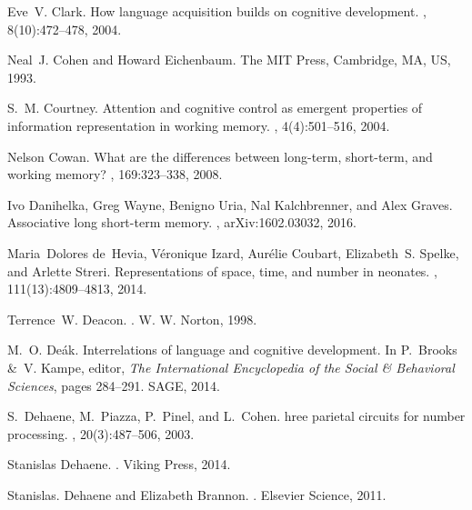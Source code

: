 \documentclass[letterpaper,11pt]{article}
\begin{document}
\begin{thebibliography}{100}
Eve~V. Clark.
\newblock How language acquisition builds on cognitive development.
, 8(10):472--478, 2004.

Neal~J. Cohen and Howard Eichenbaum.
\newblock The MIT Press, Cambridge, MA, US, 1993.

S.~M. Courtney.
\newblock Attention and cognitive control as emergent properties of information
  representation in working memory.
,
  4(4):501--516, 2004.

Nelson Cowan.
\newblock What are the differences between long-term, short-term, and working
  memory?
, 169:323--338, 2008.

Ivo Danihelka, Greg Wayne, Benigno Uria, Nal Kalchbrenner, and Alex Graves.
\newblock Associative long short-term memory.
, arXiv:1602.03032, 2016.

Maria~Dolores de~Hevia, V\'{e}ronique Izard, Aur\'{e}lie Coubart, Elizabeth~S.
  Spelke, and Arlette Streri.
\newblock Representations of space, time, and number in neonates.
,
  111(13):4809--4813, 2014.

Terrence~W. Deacon.
.
\newblock W. W. Norton, 1998.

M.~O. De\'{a}k.
\newblock Interrelations of language and cognitive development.
\newblock In P.~Brooks \&~V. Kampe, editor, {\em The International Encyclopedia
  of the Social \& Behavioral Sciences}, pages 284--291. SAGE, 2014.

S.~Dehaene, M.~Piazza, P.~Pinel, and L.~Cohen.
hree parietal circuits for number processing.
, 20(3):487--506, 2003.

Stanislas Dehaene.
.
\newblock Viking Press, 2014.

Stanislas. Dehaene and Elizabeth Brannon.
.
\newblock Elsevier Science, 2011.


\end{thebibliography}
\end{document}
